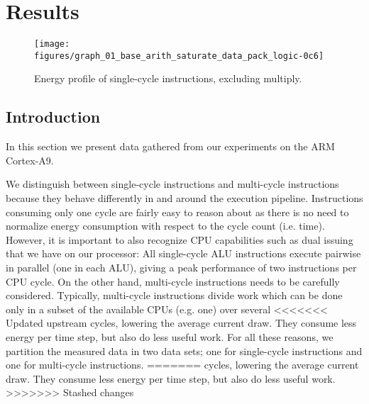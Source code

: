 \section{Results}

%
%
%
%

\begin{figure*}[ht]
    \centering
    \texttt{[image: figures/graph\_01\_base\_arith\_saturate\_data\_pack\_logic-0c6]}
    \caption{Energy profile of single-cycle instructions, excluding multiply.}
    \label{fig:singlecycle}
\end{figure*}


\subsection{Introduction}
In this section we present data gathered from our experiments on the ARM
Cortex-A9.

We distinguish between single-cycle instructions and multi-cycle instructions
because they behave differently in and around the execution pipeline.
Instructions consuming only one cycle are fairly easy to reason about as there
is no need to normalize energy consumption with respect to the cycle count (i.e.
time). However, it is important to also recognize CPU capabilities such as dual
issuing that we have on our processor: All single-cycle ALU instructions execute
pairwise in parallel (one in each ALU), giving a peak performance of two
instructions per CPU cycle. On the other hand, multi-cycle instructions needs to
be carefully considered. Typically, multi-cycle instructions divide work which
can be done only in a subset of the available CPUs (e.g. one) over several
<<<<<<< Updated upstream
cycles, lowering the average current draw. They consume less energy per
time step, but also do less useful work. For all these reasons, we partition the
measured data in two data sets; one for single-cycle instructions and one for
multi-cycle instructions.
=======
cycles, lowering the average current draw. They consume less energy per time
step, but also do less useful work.
>>>>>>> Stashed changes

